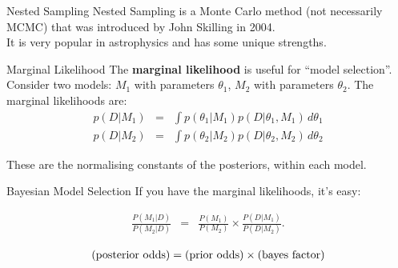 \documentclass{beamer}
\begin{document}
\begin{frame}[t]{Nested Sampling}
Nested Sampling is a Monte Carlo method (not necessarily MCMC) that was
introduced by John Skilling in 2004.\\
\vspace{20pt}
It is very popular in astrophysics and has some unique strengths.
\end{frame}


\begin{frame}[t]{Marginal Likelihood}
The {\bf marginal likelihood} is useful for ``model selection''. Consider
two models: $M_1$ with parameters $\theta_1$, $M_2$ with parameters $\theta_2$.
The marginal likelihoods are:
\begin{eqnarray*}
p(D | M_1) &=& \int p(\theta_1 | M_1) p(D | \theta_1, M_1) \, d\theta_1\\
p(D | M_2) &=& \int p(\theta_2 | M_2) p(D | \theta_2, M_2) \, d\theta_2
\end{eqnarray*}

These are the normalising constants of the posteriors, within each model.
\end{frame}


\begin{frame}[t]{Bayesian Model Selection}
If you have the marginal likelihoods, it's easy:

\begin{eqnarray*}
\frac{P(M_1 | D)}{P(M_2 | D)} &=& \frac{P(M_1)}{P(M_2)}
\times \frac{P(D | M_1)}{P(D | M_2)}.
\end{eqnarray*}

\begin{eqnarray*}
\textnormal{(posterior odds)} = \textnormal{(prior odds)} \times \textnormal{(bayes factor)}
\end{eqnarray*}

\end{frame}
\end{document}
